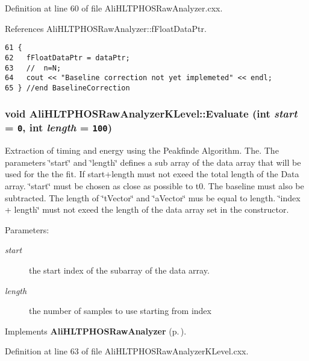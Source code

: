 Definition at line 60 of file Ali\-HLTPHOSRaw\-Analyzer.cxx.

References Ali\-HLTPHOSRaw\-Analyzer::f\-Float\-Data\-Ptr.

\footnotesize\begin{verbatim}61 {
62   fFloatDataPtr = dataPtr;  
63   //  n=N;
64   cout << "Baseline correction not yet implemeted" << endl;
65 } //end BaselineCorrection
\end{verbatim}\normalsize 


\subsubsection{\setlength{\rightskip}{0pt plus 5cm}void Ali\-HLTPHOSRaw\-Analyzer\-KLevel::Evaluate (int {\em start} = {\tt 0}, int {\em length} = {\tt 100})\hspace{0.3cm}{\tt  [virtual]}}\label{classAliHLTPHOSRawAnalyzerKLevel_AliHLTPHOSRawAnalyzerKLevela4}


Extraction of timing and energy using the Peakfinde Algorithm. The. The parameters \char`\"{}start\char`\"{} and \char`\"{}length\char`\"{} defines a sub array of the data array that will be used for the the fit. If start+length must not exeed the total length of the Data array. \char`\"{}start\char`\"{} must be chosen as close as possible to t0. The baseline must also be subtracted. The length of \char`\"{}t\-Vector\char`\"{} and \char`\"{}a\-Vector\char`\"{} mus be equal to length. \char`\"{}index + length\char`\"{} must not exeed the length of the data array set in the constructor. \begin{Desc}
\item[Parameters:]
\begin{description}
\item[{\em start}]the start index of the subarray of the data array. \item[{\em length}]the number of samples to use starting from index \end{description}
\end{Desc}


Implements {\bf Ali\-HLTPHOSRaw\-Analyzer} {\rm (p.\,\pageref{classAliHLTPHOSRawAnalyzer_AliHLTPHOSRawAnalyzerPeakFindera17})}.

Definition at line 63 of file Ali\-HLTPHOSRaw\-Analyzer\-KLevel.cxx.

